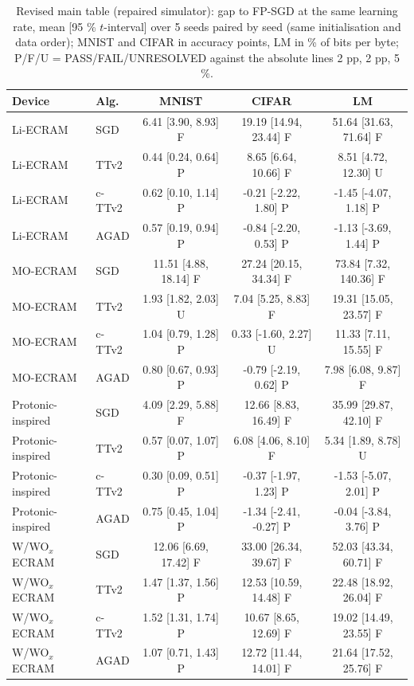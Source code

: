 \begin{table}[t]\centering\footnotesize\caption{Revised main table (repaired simulator): gap to FP-SGD at the same learning rate, mean [95 \% $t$-interval] over 5 seeds paired by seed (same initialisation and data order); MNIST and CIFAR in accuracy points, LM in \% of bits per byte; P/F/U = PASS/FAIL/UNRESOLVED against the absolute lines 2 pp, 2 pp, 5 \%.}\label{tab:rev_vs_fp}
\begin{tabular}{llccc}\toprule Device & Alg. & MNIST & CIFAR & LM\\\midrule
Li-ECRAM & SGD & 6.41 [3.90, 8.93] F & 19.19 [14.94, 23.44] F & 51.64 [31.63, 71.64] F\\
Li-ECRAM & TTv2 & 0.44 [0.24, 0.64] P & 8.65 [6.64, 10.66] F & 8.51 [4.72, 12.30] U\\
Li-ECRAM & c-TTv2 & 0.62 [0.10, 1.14] P & -0.21 [-2.22, 1.80] P & -1.45 [-4.07, 1.18] P\\
Li-ECRAM & AGAD & 0.57 [0.19, 0.94] P & -0.84 [-2.20, 0.53] P & -1.13 [-3.69, 1.44] P\\
MO-ECRAM & SGD & 11.51 [4.88, 18.14] F & 27.24 [20.15, 34.34] F & 73.84 [7.32, 140.36] F\\
MO-ECRAM & TTv2 & 1.93 [1.82, 2.03] U & 7.04 [5.25, 8.83] F & 19.31 [15.05, 23.57] F\\
MO-ECRAM & c-TTv2 & 1.04 [0.79, 1.28] P & 0.33 [-1.60, 2.27] U & 11.33 [7.11, 15.55] F\\
MO-ECRAM & AGAD & 0.80 [0.67, 0.93] P & -0.79 [-2.19, 0.62] P & 7.98 [6.08, 9.87] F\\
Protonic-inspired & SGD & 4.09 [2.29, 5.88] F & 12.66 [8.83, 16.49] F & 35.99 [29.87, 42.10] F\\
Protonic-inspired & TTv2 & 0.57 [0.07, 1.07] P & 6.08 [4.06, 8.10] F & 5.34 [1.89, 8.78] U\\
Protonic-inspired & c-TTv2 & 0.30 [0.09, 0.51] P & -0.37 [-1.97, 1.23] P & -1.53 [-5.07, 2.01] P\\
Protonic-inspired & AGAD & 0.75 [0.45, 1.04] P & -1.34 [-2.41, -0.27] P & -0.04 [-3.84, 3.76] P\\
W/WO$_x$ ECRAM & SGD & 12.06 [6.69, 17.42] F & 33.00 [26.34, 39.67] F & 52.03 [43.34, 60.71] F\\
W/WO$_x$ ECRAM & TTv2 & 1.47 [1.37, 1.56] P & 12.53 [10.59, 14.48] F & 22.48 [18.92, 26.04] F\\
W/WO$_x$ ECRAM & c-TTv2 & 1.52 [1.31, 1.74] P & 10.67 [8.65, 12.69] F & 19.02 [14.49, 23.55] F\\
W/WO$_x$ ECRAM & AGAD & 1.07 [0.71, 1.43] P & 12.72 [11.44, 14.01] F & 21.64 [17.52, 25.76] F\\

\end{tabular}
\end{table}
